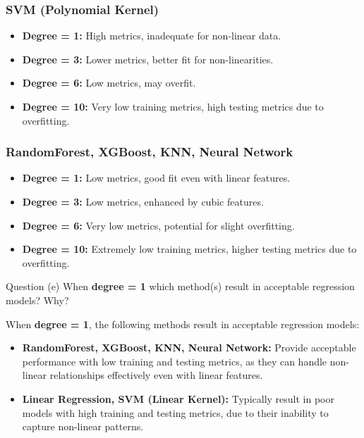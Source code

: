 \subsubsection*{SVM (Polynomial Kernel)}

\begin{itemize}
    \item \textbf{Degree = 1:} High metrics, inadequate for non-linear data.
    \item \textbf{Degree = 3:} Lower metrics, better fit for non-linearities.
    \item \textbf{Degree = 6:} Low metrics, may overfit.
    \item \textbf{Degree = 10:} Very low training metrics, high testing metrics due to overfitting.
\end{itemize}

\subsubsection*{RandomForest, XGBoost, KNN, Neural Network}

\begin{itemize}
    \item \textbf{Degree = 1:} Low metrics, good fit even with linear features.
    \item \textbf{Degree = 3:} Low metrics, enhanced by cubic features.
    \item \textbf{Degree = 6:} Very low metrics, potential for slight overfitting.
    \item \textbf{Degree = 10:} Extremely low training metrics, higher testing metrics due to overfitting.
\end{itemize}

\clearpage

\begin{customboxnew}[label={box:Q3e}]{Question (e)}
	When \textbf{degree = 1} which method(s) result in acceptable regression models? Why?
\end{customboxnew}

When \textbf{degree = 1}, the following methods result in acceptable regression models:

\begin{itemize}
    \item \textbf{RandomForest, XGBoost, KNN, Neural Network:} Provide acceptable performance with low training and testing metrics, as they can handle non-linear relationships effectively even with linear features.
    \item \textbf{Linear Regression, SVM (Linear Kernel):} Typically result in poor models with high training and testing metrics, due to their inability to capture non-linear patterns.
\end{itemize}

